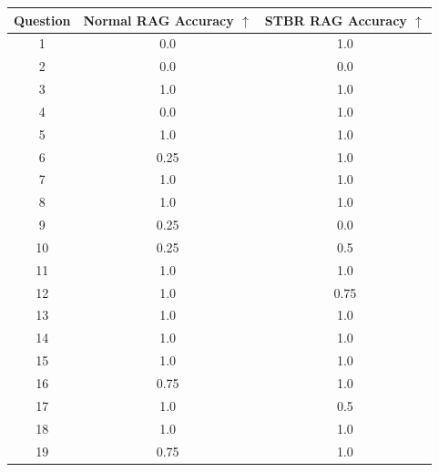 \documentclass[a4paper,12pt,twoside]{ThesisStyle}
\begin{document}
\begin{table}[H]
  \centering
  \begin{tabular}{|c|c|c|}
    \hline
    \textbf{Question} & \textbf{Normal RAG Accuracy \(\uparrow\)} & \textbf{STBR RAG Accuracy \(\uparrow\)} \\
    \hline
    1                 & 0.0                          & 1.0                        \\
    2                 & 0.0                          & 0.0                        \\
    3                 & 1.0                          & 1.0                        \\
    4                 & 0.0                          & 1.0                        \\
    5                 & 1.0                          & 1.0                        \\
    6                 & 0.25                          & 1.0                        \\
    7                 & 1.0                          & 1.0                        \\
    8                 & 1.0                          & 1.0                        \\
    9                 & 0.25                          & 0.0                        \\
    10                & 0.25                          & 0.5                        \\
    11                & 1.0                          & 1.0                        \\
    12                & 1.0                          & 0.75                        \\
    13                & 1.0                          & 1.0                        \\
    14                & 1.0                          & 1.0                        \\
    15                & 1.0                          & 1.0                        \\
    16                & 0.75                          & 1.0                        \\
    17                & 1.0                          & 0.5                        \\
    18                & 1.0                          & 1.0                        \\
    19                & 0.75                          & 1.0                        \\

\end{tabular}
\end{table}
\end{document}

